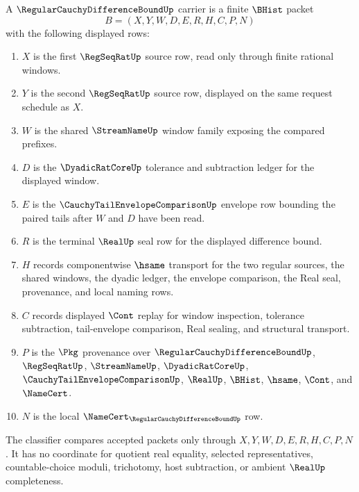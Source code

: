 \begin{definition}
\label{def:regular-cauchy-difference-bound-carrier}
A $\RegularCauchyDifferenceBoundUp$ carrier is a finite $\BHist$ packet
$$
B=(X,Y,W,D,E,R,H,C,P,N)
$$
with the following displayed rows:
\begin{enumerate}
\item $X$ is the first $\RegSeqRatUp$ source row, read only through finite rational windows.
\item $Y$ is the second $\RegSeqRatUp$ source row, displayed on the same request schedule as $X$.
\item $W$ is the shared $\StreamNameUp$ window family exposing the compared prefixes.
\item $D$ is the $\DyadicRatCoreUp$ tolerance and subtraction ledger for the displayed window.
\item $E$ is the $\CauchyTailEnvelopeComparisonUp$ envelope row bounding the paired tails after $W$ and $D$ have been read.
\item $R$ is the terminal $\RealUp$ seal row for the displayed difference bound.
\item $H$ records componentwise $\hsame$ transport for the two regular sources, the shared windows, the dyadic ledger, the envelope comparison, the Real seal, provenance, and local naming rows.
\item $C$ records displayed $\Cont$ replay for window inspection, tolerance subtraction, tail-envelope comparison, Real sealing, and structural transport.
\item $P$ is the $\Pkg$ provenance over $\RegularCauchyDifferenceBoundUp$, $\RegSeqRatUp$, $\StreamNameUp$, $\DyadicRatCoreUp$, $\CauchyTailEnvelopeComparisonUp$, $\RealUp$, $\BHist$, $\hsame$, $\Cont$, and $\NameCert$.
\item $N$ is the local $\NameCert_{\RegularCauchyDifferenceBoundUp}$ row.
\end{enumerate}
The classifier compares accepted packets only through $X,Y,W,D,E,R,H,C,P,N$. It has no coordinate for quotient real equality, selected representatives, countable-choice moduli, trichotomy, host subtraction, or ambient $\RealUp$ completeness.
\end{definition}

